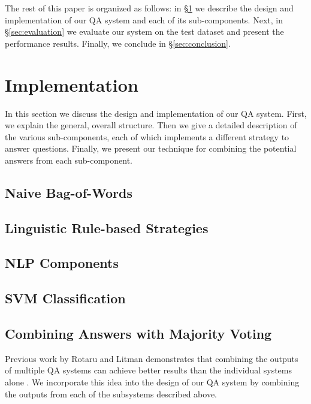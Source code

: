 \documentclass{acm_proc_article-sp}
\begin{document}
The rest of this paper is organized as follows: in
\S\ref{sec:implementation} we describe the design and implementation
of our QA system and each of its sub-components. Next, in
\S\ref{sec:evaluation} we evaluate our system on the test dataset and
present the performance results. Finally, we conclude in
\S\ref{sec:conclusion}.


\section{Implementation}
\label{sec:implementation}

In this section we discuss the design and implementation of our QA
system. First, we explain the general, overall structure. Then we give
a detailed description of the various sub-components, each of which
implements a different strategy to answer questions. Finally, we
present our technique for combining the potential answers from each
sub-component.


\subsection{Naive Bag-of-Words}


\subsection{Linguistic Rule-based Strategies}


\subsection{NLP Components}


\subsection{SVM Classification}


\subsection{Combining Answers with Majority Voting}
Previous work by Rotaru and Litman demonstrates that combining
the outputs of multiple QA systems can achieve better results than the
individual systems alone \cite{rotaru2005}. We incorporate this idea
into the design of our QA system by combining the outputs from each of
the subsystems described above.
\end{document}
